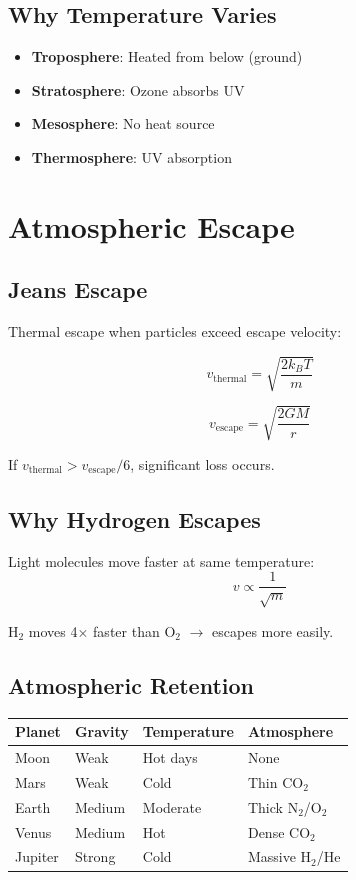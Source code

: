 \documentclass[
  11pt,
  letterpaper,
  twoside,
  openright]{book}
\providecommand{\tightlist}{%
  \setlength{\itemsep}{0pt}\setlength{\parskip}{0pt}}
\begin{document}
\subsection{Why Temperature Varies}\label{why-temperature-varies}

\begin{itemize}
\tightlist
\item
  \textbf{Troposphere}: Heated from below (ground)
\item
  \textbf{Stratosphere}: Ozone absorbs UV
\item
  \textbf{Mesosphere}: No heat source
\item
  \textbf{Thermosphere}: UV absorption
\end{itemize}

\section{Atmospheric Escape}\label{atmospheric-escape}

\subsection{Jeans Escape}\label{jeans-escape}

Thermal escape when particles exceed escape velocity:

\[
v_{\text{thermal}} = \sqrt{\frac{2k_BT}{m}}
\]

\[
v_{\text{escape}} = \sqrt{\frac{2GM}{r}}
\]

If \(v_{\text{thermal}} > v_{\text{escape}}/6\), significant loss
occurs.

\subsection{Why Hydrogen Escapes}\label{why-hydrogen-escapes}

Light molecules move faster at same temperature: \[
v \propto \frac{1}{\sqrt{m}}
\]

\(\text{H}_2\) moves 4\(\times\) faster than \(\text{O}_2\) \(\to\)
escapes more easily.

\subsection{Atmospheric Retention}\label{atmospheric-retention}

\begin{longtable}[]{@{}llll@{}}
\toprule\noalign{}
Planet & Gravity & Temperature & Atmosphere \\
\midrule\noalign{}
\endhead
\bottomrule\noalign{}
\endlastfoot
Moon & Weak & Hot days & None \\
Mars & Weak & Cold & Thin \(\text{CO}_2\) \\
Earth & Medium & Moderate & Thick \(\text{N}_2\)/\(\text{O}_2\) \\
Venus & Medium & Hot & Dense \(\text{CO}_2\) \\
Jupiter & Strong & Cold & Massive \(\text{H}_2\)/He \\
\end{longtable}
\end{document}
